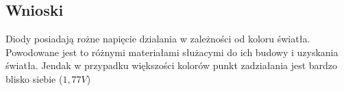 \documentclass[11pt]{article}
\begin{document}
\subsection{Wnioski}
Diody posiadają rożne napięcie dzialania w zależności od koloru światła. Powodowane jest to różnymi materiałami służacymi do ich budowy i uzyskania światła. Jendak w przypadku większości kolorów punkt zadziałania jest bardzo blisko siebie ($1,77V$) 
\end{document}
